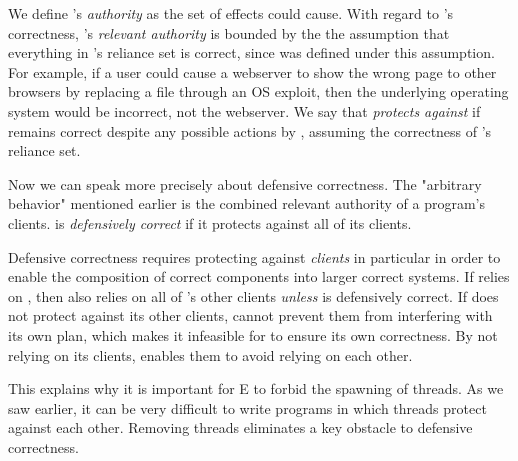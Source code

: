 \documentclass{llncs}
\begin{document}
We define 's \emph{authority} as the set of effects 
could cause.  With regard to 's correctness, 's
\emph{relevant authority} is bounded by the the assumption that
everything in 's reliance set is correct, since  was
defined under this assumption. For example, if a user could cause a
webserver to show the wrong page to other browsers by replacing a
file through an OS exploit, then the underlying operating system would
be incorrect, not the webserver. We say that  \emph{protects
against}  if  remains correct despite any possible
actions by , assuming the correctness of 's reliance
set.


Now we can speak more precisely about defensive correctness. The
"arbitrary behavior" mentioned earlier is the combined relevant
authority of a program's clients.  is \emph{defensively
correct} if it protects against all of its clients.


Defensive correctness requires protecting against \emph{clients} in
particular in order to enable the composition of correct components
into larger correct systems. If  relies on , then
 also relies on all of 's other clients \emph{unless}
 is defensively correct.  If  does not protect against
its other clients,  cannot prevent them from interfering with
its own plan, which makes it infeasible for  to ensure its own
correctness.  By not relying on its clients,  enables them
to avoid relying on each other.

This explains why it is important for E to forbid the spawning of
threads.  As we saw earlier, it can be very difficult to write
programs in which threads protect against each other.  Removing
threads eliminates a key obstacle to defensive correctness.
\end{document}
